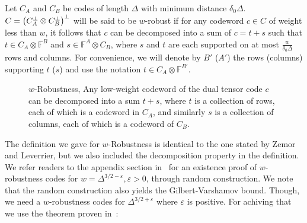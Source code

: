 \begin{definition}[$w$-Robustness] 
  \label{def:wrobust}
  Let $C_{A}$ and $C_{B}$ be codes of length $\Delta$ with minimum distance $\delta_{0}\Delta$. $C = \left( C_{A}^{\perp}\otimes C_{B}^{\perp} \right)^{\perp} $ will be said to be $w$-robust if for any codeword $c \in C$ of weight less than $w$, it follows that $c$ can be decomposed into a sum of $c = t + s$ such that $t \in C_A \otimes \mathbb{F}^{B}$ and $s \in \mathbb{F}^A \otimes C_B$, where $s$ and $t$ are each supported on at most $\frac{w}{\delta_0\Delta}$ rows and columns. For convenience, we will denote by $B'$ ($A'$) the rows (columns) supporting $t$ ($s$) and use the notation $t \in C_A \otimes \mathbb{F}^{B'}$.
\end{definition}

\begin{figure}[h]
  \label{fig:wrobustf}
            \caption{$w$-Robustness, Any low-weight codeword of the dual tensor code $c$ can be decomposed into a sum $t+s$, where $t$ is a collection of rows, each of which is a codeword in $C_A$, and similarly $s$ is a collection of columns, each of which is a codeword of $C_B$. }
\end{figure}

The definition we gave for $w$-Robustness is identical to the one stated by Zemor and Leverrier, but we also included the decomposition property in the definition. We refer readers to the appendix section in~\cite{leverrier2022quantum} for an existence proof of $w$-robustness codes for $w = \Delta^{3/2 - \varepsilon}, \varepsilon > 0$, through random construction. We note that the random construction also yields the Gilbert-Varshamov bound. Though, we need a $w$-robustness codes for $\Delta^{3/2+\varepsilon}$ where $\varepsilon$ is positive. For achiving that we use the theorem proven in~\cite{kalachev2022twosided}:  

